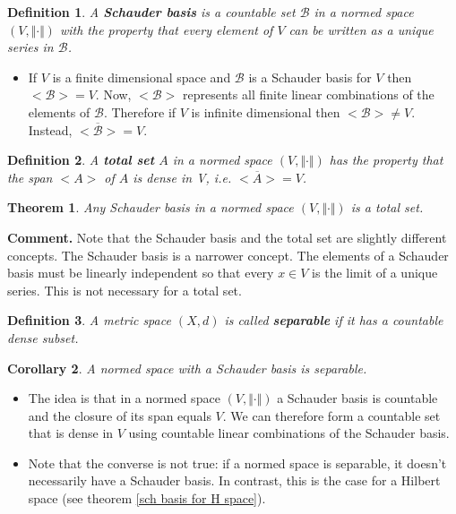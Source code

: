 \documentclass[two column]{article}
\newtheorem{theorem}{Theorem}[subsection]
\newtheorem{corollary}[theorem]{Corollary}
\newtheorem{definition}{Definition}[subsection]
\begin{document}
\begin{definition}
A {\bf Schauder basis} is a countable set $\mathcal{B}$ in a normed space $(V, \Vert \cdot \Vert)$ with the property that every element of $V$ can be written as a unique series in $\mathcal{B}$.
\end{definition}
\begin{itemize}
\item If $V$ is a finite dimensional space and $\mathcal{B}$ is a Schauder basis for $V$ then $<\mathcal{B}> = V$. Now, $<\mathcal{B}>$ represents all finite linear combinations of the elements of $\mathcal{B}$. Therefore if $V$ is infinite dimensional then $<\mathcal{B}> \neq V$. Instead, $\overline{<\mathcal{B}>} = V$. \\
\end{itemize}

\begin{definition}
A {\bf total set} $A$ in a normed space $(V, \Vert \cdot \Vert)$ has the property that the span $<A>$ of $A$ is dense in V, i.e. $\overline{<A>} = V$. \\
\end{definition}

\begin{theorem}
Any Schauder basis in a normed space $(V, \Vert \cdot \Vert)$ is a total set. \vspace{+6pt}
\end{theorem}

{\bf Comment.} Note that the Schauder basis and the total set are slightly different concepts. The Schauder basis is a  narrower concept. The elements of a Schauder basis must be linearly independent so that every $x \in V$ is the limit of a unique series. This is not necessary for a total set. \\

\begin{definition}
A metric space $(X,d)$ is called {\bf separable} if it has a countable dense subset. \\
\end{definition}

\begin{corollary}
A normed space with a Schauder basis is separable. 
\end{corollary}
\begin{itemize}
\item The idea is that in a normed space $(V, \Vert \cdot \Vert)$ a Schauder basis is countable and the closure of its span equals $V$. We can therefore form a countable set that is dense in $V$ using countable linear combinations of the Schauder basis. 
\item Note that the converse is not true: if a normed space is separable, it doesn't necessarily have a Schauder basis. In contrast, this is the case for a Hilbert space (see theorem \ref{sch basis for H space}). 
\end{itemize}
\end{document}
